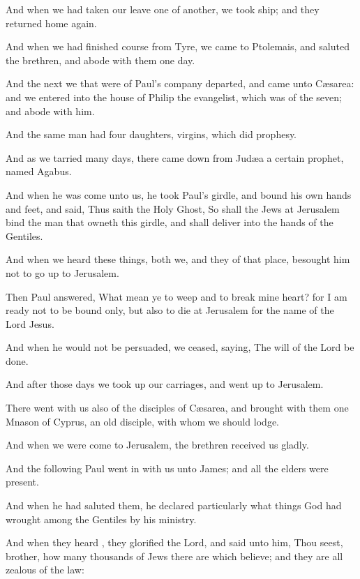{And when we had taken our
leave one of
another, we
took
ship;
and
they
returned home
again.

And when
we had
finished
{}
course
from
Tyre, we
came
to
Ptolemais,
and
saluted the
brethren, and
abode
with
them
one
day.

And the
next
{} we that
were
of
Paul’s company
departed, and
came
unto
Cæsarea:
and we
entered
into the
house of
Philip the
evangelist, which
was
{}
of the
seven; and
abode
with
him.

And the same
man
had
four
daughters,
virgins, which did
prophesy.

And as
we
tarried
{}
many
days, there came
down
from
Judæa a
certain
prophet,
named
Agabus.

And when he was
come
unto
us, he
took
Paul’s
girdle,
and
bound his
own
hands
and
feet, and
said,
Thus
saith the
Holy
Ghost,
So
shall the
Jews
at
Jerusalem
bind the
man
that
owneth
this
girdle,
and shall
deliver
{}
into the
hands of the
Gentiles.

And
when we
heard these
things,
both
we,
and
they of that
place,
besought
him
not
to go
up to
Jerusalem.

Then
Paul
answered,
What mean
ye to
weep
and to
break
mine
heart?
for
I
am
ready
not to be
bound
only,
but
also to
die
at
Jerusalem
for the
name of the
Lord
Jesus.

And
when
he
would
not be
persuaded, we
ceased,
saying, The
will of the
Lord be
done.


\par }{\PP {}And
after
those
days we took up our
carriages, and went
up
to
Jerusalem.

There
went
with
us
also
{} of the
disciples
of
Cæsarea, and brought with
them
one
Mnason of
Cyprus, an
old
disciple,
with
whom we should
lodge.

And when
we were
come
to
Jerusalem, the
brethren
received
us
gladly.

And
the
{}
following
Paul went
in
with
us
unto
James;
and
all the
elders were
present.

And when he had
saluted
them, he
declared
particularly what
things
God had
wrought
among the
Gentiles
by
his
ministry.

And when they
heard
{}, they
glorified the
Lord,
and
said unto
him, Thou
seest,
brother, how
many
thousands of
Jews there
are
which
believe;
and they
are
all
zealous of the
law:

}
